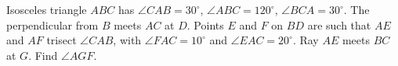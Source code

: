 Isosceles triangle $ABC$ has $\angle CAB=30^\circ$, $\angle ABC=120^\circ$, $\angle BCA=30^\circ$. The perpendicular from $B$ meets $AC$ at $D$. Points $E$ and $F$ on $BD$ are such that $AE$ and $AF$ trisect $\angle CAB$, with $\angle FAC=10^\circ$ and $\angle EAC=20^\circ$. Ray $AE$ meets $BC$ at $G$. Find $\angle AGF$.
